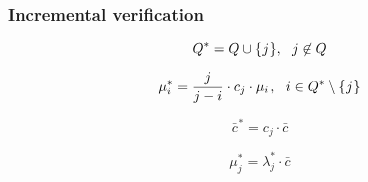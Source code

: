 \documentclass[psamsfonts, reqno]{amsart}
\theoremstyle{definition}
\theoremstyle{remark}
\numberwithin{equation}{section}
\begin{document}
\subsubsection{Incremental verification}\label{section_incremental _verification}
\begin{equation}
Q^* = Q \cup \{\hspace{0.5pt}j\hspace{0.5pt}\},
\ \ j \not \in Q
\end{equation}


\begin{equation}
\mu_i^* = \frac{j}{j - i} \cdot c_j \cdot \mu_i\hspace{1pt},
\ \ i \in Q^* \setminus \{\hspace{0.5pt}j\hspace{0.5pt}\}
\end{equation}

\begin{equation}
\bar{c}^{\hspace{1pt}*} = c_j \cdot \bar{c}
\end{equation}

\begin{equation}
\mu_j^* = \lambda_j^* \cdot \bar{c}
\end{equation}
\end{document}
